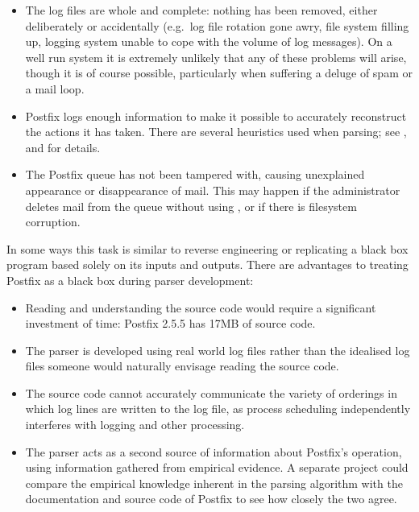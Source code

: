 \begin{itemize}

    \item The log files are whole and complete: nothing has been removed,
        either deliberately or accidentally (e.g.\ log file rotation gone
        awry, file system filling up, logging system unable to cope with
        the volume of log messages).  On a well run system it is extremely
        unlikely that any of these problems will arise, though it is of
        course possible, particularly when suffering a deluge of spam or a
        mail loop.

    \item Postfix logs enough information to make it possible to accurately
        reconstruct the actions it has taken.  There are several heuristics
        used when parsing; see
        ,
         and  for details.

    \item The Postfix queue has not been tampered with, causing unexplained
        appearance or disappearance of mail.  This may happen if the
        administrator deletes mail from the queue without using
        , or if there is filesystem corruption.

\end{itemize}

In some ways this task is similar to reverse engineering or replicating a
black box program based solely on its inputs and outputs.  There are
advantages to treating Postfix as a black box during parser development:

\begin{itemize}

    \item Reading and understanding the source code would require a
        significant investment of time: Postfix 2.5.5 has 17MB of source
        code.  

    \item The parser is developed using real world log files rather than
        the idealised log files someone would naturally envisage reading
        the source code.

    \item The source code cannot accurately communicate the variety of
        orderings in which log lines are written to the log file, as
        process scheduling independently interferes with logging and other
        processing.

    \item The parser acts as a second source of information about Postfix's
        operation, using information gathered from empirical evidence.  A
        separate project could compare the empirical knowledge inherent in
        the parsing algorithm with the documentation and source code of
        Postfix to see how closely the two agree.

\end{itemize}



